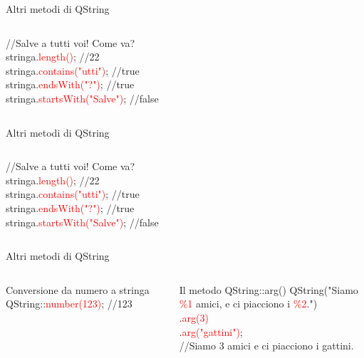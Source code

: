 \documentclass{beamer}
\begin{document}
\begin{frame}{Altri metodi di QString}
	\begin{columns}
		\begin{block}{}
			{\ttfamily //Salve a tutti voi! Come va?\\
				\bigskip
				stringa.\textcolor{red}{length()}; //22\\
				\bigskip
				stringa.\textcolor{red}{contains("utti")}; //true\\
				\bigskip
				stringa.\textcolor{red}{endsWith("?")}; //true\\
				\bigskip
				stringa.\textcolor{red}{startsWith("Salve")}; //false}
		\end{block}
	\end{columns}
\end{frame}

\begin{frame}{Altri metodi di QString}
	\begin{columns}
		\column{0.7\textwidth}
		\begin{block}{}
			{\ttfamily //Salve a tutti voi! Come va?\\
				\bigskip
				stringa.\textcolor{red}{length()}; //22\\
				\bigskip
				stringa.\textcolor{red}{contains("utti")}; //true\\
				\bigskip
				stringa.\textcolor{red}{endsWith("?")}; //true\\
				\bigskip
				stringa.\textcolor{red}{startsWith("Salve")}; //false}
		\end{block}
	\end{columns}
\end{frame}

\begin{frame}{Altri metodi di QString}
	\begin{columns}
		\column{0.8\textwidth}
		\begin{block}{Conversione da numero a stringa}
			{\ttfamily QString::\textcolor{red}{number(123)};  //123}
		\end{block}
		\bigskip

		\begin{block}{Il metodo QString::arg()}
			{\ttfamily QString("Siamo \textcolor{red}{\%1} amici, e ci piacciono i \textcolor{red}{\%2}.")\\
				.\textcolor{red}{arg(3)}\\
				.\textcolor{red}{arg("gattini")};\\
				//Siamo 3 amici e ci piacciono i gattini.}
		\end{block}
	\end{columns}
\end{frame}
\end{document}
